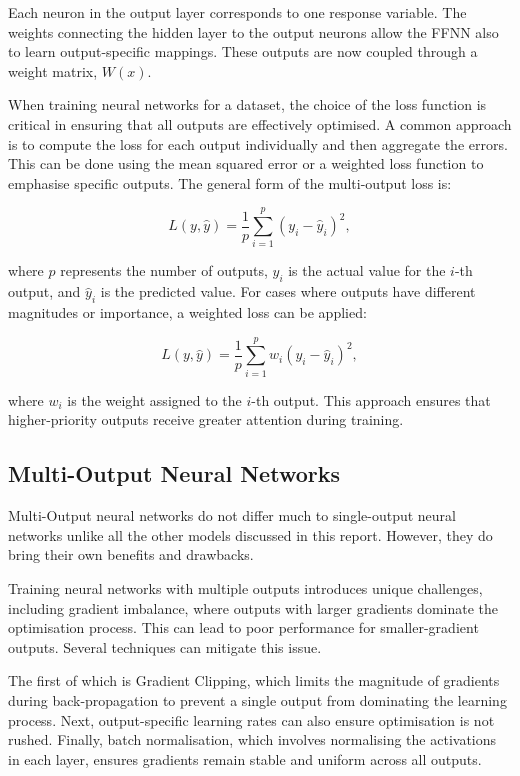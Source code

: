 Each neuron in the output layer corresponds to one response variable. The weights connecting the hidden layer to the output neurons allow the FFNN also to learn output-specific mappings. These outputs are now coupled through a weight matrix, $W(x)$.

When training neural networks for a dataset, the choice of the loss function is critical in ensuring that all outputs are effectively optimised. A common approach is to compute the loss for each output individually and then aggregate the errors.\cite{menet2023mimonets} This can be done using the mean squared error or a weighted loss function to emphasise specific outputs.\cite{menet2023mimonets} The general form of the multi-output loss is:

\[
L(y, \hat{y}) = \frac{1}{p} \sum_{i=1}^{p} \left( y_i - \hat{y}_i \right)^2,
\]

\noindent where \( p \) represents the number of outputs, \( y_i \) is the actual value for the \( i \)-th output, and \( \hat{y}_i \) is the predicted value. For cases where outputs have different magnitudes or importance, a weighted loss can be applied:

\[
L(y, \hat{y}) = \frac{1}{p} \sum_{i=1}^{p} w_i \left( y_i - \hat{y}_i \right)^2,
\]

\noindent where \( w_i \) is the weight assigned to the \( i \)-th output. This approach ensures that higher-priority outputs receive greater attention during training.

\subsection{Multi-Output Neural Networks}
Multi-Output neural networks do not differ much to single-output neural networks unlike all the other models discussed in this report. However, they do bring their own benefits and drawbacks.

Training neural networks with multiple outputs introduces unique challenges, including gradient imbalance, where outputs with larger gradients dominate the optimisation process.\cite{menet2023mimonets} This can lead to poor performance for smaller-gradient outputs. Several techniques can mitigate this issue. 

\noindent The first of which is Gradient Clipping, which limits the magnitude of gradients during back-propagation to prevent a single output from dominating the learning process. Next, output-specific learning rates can also ensure optimisation is not rushed. Finally, batch normalisation, which involves normalising the activations in each layer, ensures gradients remain stable and uniform across all outputs.

